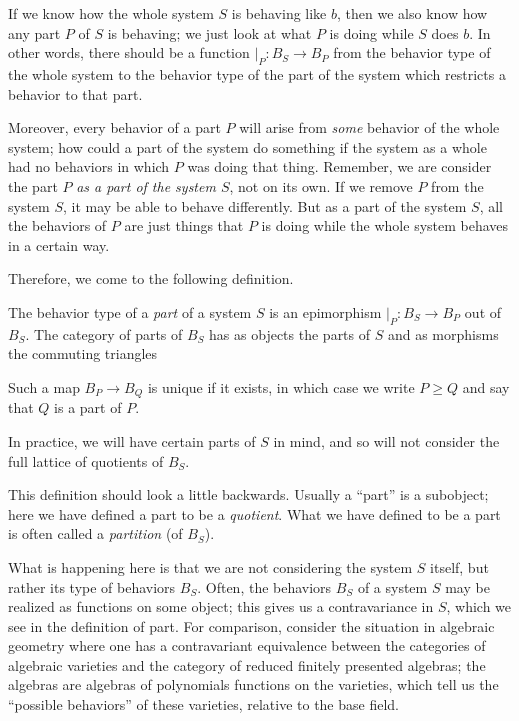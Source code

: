 
If we know how the whole system $S$ is behaving like $b$, then we also know how any part $P$ of $S$ is behaving; we just look at what $P$ is doing while $S$ does $b$. In other words, there should be a function $|_P : B_S \to B_P$ from the behavior type of the whole system to the behavior type of the part of the system which restricts a behavior to that part. 

Moreover, every behavior of a part $P$ will arise from \emph{some} behavior of the whole system; how could a part of the system do something if the system as a whole had no behaviors in which $P$ was doing that thing. Remember, we are consider the part $P$ \emph{as a part of the system $S$}, not on its own. If we remove $P$ from the system $S$, it may be able to behave differently. But as a part of the system $S$, all the behaviors of $P$ are just things that $P$ is doing while the whole system behaves in a certain way.

Therefore, we come to the following definition.
\begin{defn}
The behavior type of a \emph{part} of a system $S$ is an epimorphism $|_P : B_S \to B_P$ out of $B_S$. The category of parts of $B_S$ has as objects the parts of $S$ and as morphisms the commuting triangles
        \begin{center}
        \end{center}
Such a map $B_P \to B_Q$ is unique if it exists, in which case we write $P \geq Q$ and say that $Q$ is a part of $P$.
\end{defn}

In practice, we will have certain parts of $S$ in mind, and so will not consider the full lattice of quotients of $B_S$. 

\begin{rmk}
This definition should look a little backwards. Usually a ``part'' is a subobject; here we have defined a part to be a \emph{quotient}. What we have defined to be a part is often called a \emph{partition} (of $B_S$). 

What is happening here is that we are not considering the system $S$ itself, but rather its type of behaviors $B_S$. Often, the behaviors $B_S$ of a system $S$ may be realized as functions on some object; this gives us a contravariance in $S$, which we see in the definition of part. For comparison, consider the situation in algebraic geometry where one has a contravariant equivalence between the categories of algebraic varieties and the category of reduced finitely presented algebras; the algebras are algebras of polynomials functions on the varieties, which tell us the ``possible behaviors'' of these varieties, relative to the base field.
\end{rmk}


